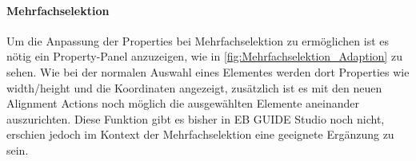 \begin{figure}%
  \centering
  \qquad
 \qquad
  \label{fig:FeatureProperty_Adaption}
\end{figure}

\paragraph{Mehrfachselektion}
Um die Anpassung der Properties bei Mehrfachselektion zu ermöglichen ist es nötig ein Property-Panel anzuzeigen, wie in \cref{fig:Mehrfachselektion_Adaption} zu sehen.
Wie bei der normalen Auswahl eines Elementes werden dort Properties wie width/height und die Koordinaten angezeigt, zusätzlich ist es mit den neuen Alignment Actions noch möglich die ausgewählten Elemente aneinander auszurichten.
Diese Funktion gibt es bisher in EB GUIDE Studio noch nicht, erschien jedoch im Kontext der Mehrfachselektion eine geeignete Ergänzung zu sein.

